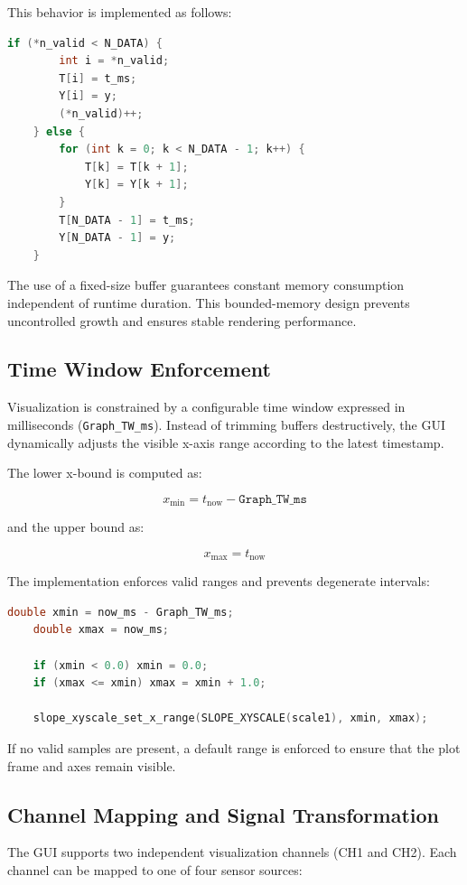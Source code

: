 This behavior is implemented as follows:

\begin{lstlisting}[language=C]
	if (*n_valid < N_DATA) {
		int i = *n_valid;
		T[i] = t_ms;
		Y[i] = y;
		(*n_valid)++;
	} else {
		for (int k = 0; k < N_DATA - 1; k++) {
			T[k] = T[k + 1];
			Y[k] = Y[k + 1];
		}
		T[N_DATA - 1] = t_ms;
		Y[N_DATA - 1] = y;
	}
\end{lstlisting}

The use of a fixed-size buffer guarantees constant memory consumption independent of runtime duration. This bounded-memory design prevents uncontrolled growth and ensures stable rendering performance.

\subsection{Time Window Enforcement}
\label{sec:gui_time_window}

Visualization is constrained by a configurable time window expressed in milliseconds (\texttt{Graph\_TW\_ms}). Instead of trimming buffers destructively, the GUI dynamically adjusts the visible x-axis range according to the latest timestamp.

The lower x-bound is computed as:

\[
x_{\min} = t_{\text{now}} - \texttt{Graph\_TW\_ms}
\]

and the upper bound as:

\[
x_{\max} = t_{\text{now}}
\]

The implementation enforces valid ranges and prevents degenerate intervals:

\begin{lstlisting}[language=C]
	double xmin = now_ms - Graph_TW_ms;
	double xmax = now_ms;
	
	if (xmin < 0.0) xmin = 0.0;
	if (xmax <= xmin) xmax = xmin + 1.0;
	
	slope_xyscale_set_x_range(SLOPE_XYSCALE(scale1), xmin, xmax);
\end{lstlisting}

If no valid samples are present, a default range is enforced to ensure that the plot frame and axes remain visible.

\subsection{Channel Mapping and Signal Transformation}
\label{sec:gui_channel_mapping}

The GUI supports two independent visualization channels (CH1 and CH2). Each channel can be mapped to one of four sensor sources:

